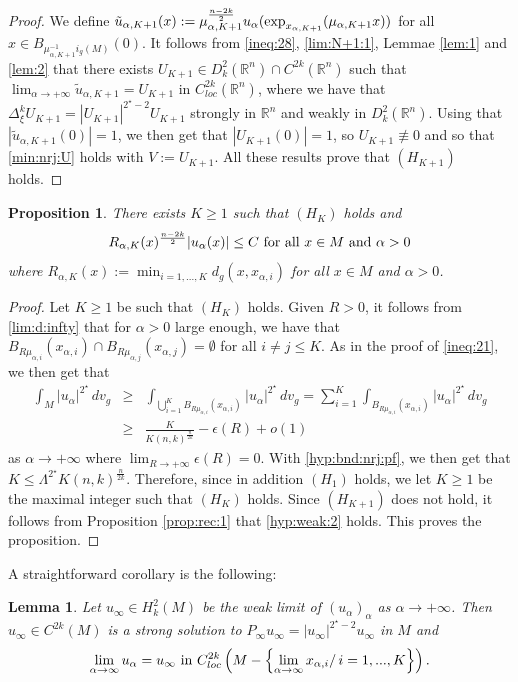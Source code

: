 \documentclass[reqno]{amsart}
\newtheorem{proposition}{Proposition}[section]
\newtheorem{lemma}{Lemma}[section]
\def \rn {\mathbb{R}^n}
\def \eps {\epsilon}
\def \crit {2^\star}
\def \ua {u_\alpha}
\def \xai {x_{\alpha,i}}
\def \mai {\mu_{\alpha,i}}
\def \maj {\mu_{\alpha,j}}
\def \xaj {x_{\alpha,j}}
\begin{document}
\begin{proof}
\smallskip\noindent We define $\tilde{u}_{\alpha,K+1}(x):=\mu_{\alpha, K+1}^{\frac{n-2k}{2}}\ua(\hbox{exp}_{x_{\alpha, K+1}}(\mu_{\alpha, K+1} x))$ for all $x\in B_{\mu_{\alpha, K+1}^{-1}i_g(M)}(0)$. It follows from \eqref{ineq:28}, \eqref{lim:N+1:1}, Lemmae \ref{lem:1} and \ref{lem:2} that there exists $U_{K+1}\in D_k^2(\rn)\cap C^{2k}(\rn)$ such that $\lim_{\alpha\to +\infty}\tilde{u}_{\alpha,K+1}=U_{K+1}$ in $C^{2k}_{loc}(\rn)$, where we have that $\Delta_\xi^kU_{K+1}=|U_{K+1}|^{\crit-2}U_{K+1}$ strongly in $\rn$ and weakly in $D_k^2(\rn)$. Using that $|\tilde{u}_{\alpha,K+1}(0)|=1$, we then get that $|U_{K+1}(0)|=1$, so $U_{K+1}\not\equiv 0$ and so that \eqref{min:nrj:U} holds with $V:= U_{K+1}$. All these results prove that $(H_{K+1})$ holds.\end{proof}


\begin{proposition}\label{prop:3.2} There exists $K\geq 1$ such that $(H_K)$ holds and 
\begin{equation}\label{hyp:weak:2}
 R_{\alpha, K}(x)^{\frac{n-2k}{2}}|\ua(x)|\leq C\hbox{ for all }x\in M\hbox{ and }\alpha>0
\end{equation}
 where $R_{\alpha, K}(x):=\min_{i=1,...,K}d_g(x,\xai)$ for all $x\in M$ and $\alpha>0$.
\end{proposition}
\begin{proof} Let $K\geq 1$ be such that $(H_K)$ holds. Given $R>0$, it follows from \eqref{lim:d:infty} that for $\alpha>0$ large enough, we have that $B_{R\mai}(\xai)\cap B_{R\maj}(\xaj)=\emptyset$ for all $i\neq j\leq K$. As in the proof of \eqref{ineq:21}, we then get that
\begin{eqnarray*}
\int_M|\ua|^{\crit}\, dv_g&\geq &\int_{\bigcup_{i=1}^K B_{R\mai}(\xai)}|\ua|^{\crit}\, dv_g=\sum_{i=1}^K\int_{  B_{R\mai}(\xai)}|\ua|^{\crit}\, dv_g\\
&\geq & \frac{K}{K(n,k)^{\frac{n}{2k}}}-\eps(R)+o(1)
\end{eqnarray*}
as $\alpha\to +\infty$ where $\lim_{R\to +\infty}\eps(R)=0$. With \eqref{hyp:bnd:nrj:pf}, we then get that $K\leq \Lambda^{\crit} K(n,k)^{\frac{n}{2k}}$. Therefore, since in addition $(H_1)$ holds, we let $K\geq 1$ be the maximal integer such that $(H_K)$ holds. Since $(H_{K+1})$ does not hold,  it follows from Proposition \ref{prop:rec:1} that \eqref{hyp:weak:2} holds. This proves the proposition.\end{proof}
A straightforward corollary is the following:
\begin{lemma}\label{prop:lim:out} Let $u_\infty\in H_k^2(M)$ be the weak limit of $(\ua)_\alpha$ as $\alpha\to +\infty$. Then $u_\infty\in C^{2k}(M)$ is a strong solution to $P_\infty u_\infty=|u_\infty|^{\crit-2}u_\infty$ in $M$ and 
\begin{equation*}
\lim_{\alpha\to\infty}u_\alpha=u_\infty\hbox{ in }C^{2k}_{loc}\left(M-\left\{\lim_{\alpha\to \infty}\xai/\,i=1,...,K\right\}\right).
\end{equation*}
\end{lemma}
\end{document}
